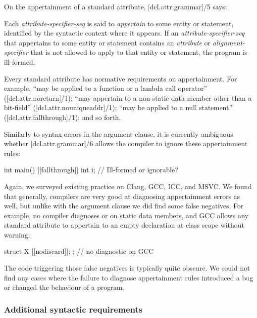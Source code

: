 On the appertainment of a standard attribute, [dcl.attr.grammar]/5 says:

\begin{adjustwidth}{0.5cm}{0.5cm}
Each \emph{attribute-specifier-seq} is said to \emph{appertain} to some entity or statement, identified by the syntactic context where it appears. If an \emph{attribute-specifier-seq} that appertains to some entity or statement contains an \emph{attribute} or \emph{alignment-specifier} that is not allowed to apply to that entity or statement, the program is ill-formed.
\end{adjustwidth}

Every standard attribute has normative requirements on appertainment. For example,  ``may be applied to a function or a lambda call operator'' ([dcl.attr.noreturn]/1); \mbox{} ``may appertain to a non-static data member other than a bit-field'' ([dcl.attr.nouniqueaddr]/1);  ``may be applied to a null statement'' ([dcl.attr.fallthrough]/1); and so forth.

Similarly to syntax errors in the argument clause, it is currently ambiguous whether [dcl.attr.grammar]/6 allows the compiler to ignore these appertainment rules:

\begin{codeblock}
int main() {
  [[fallthrough]] int i;  // Ill-formed or ignorable?
}
\end{codeblock}

Again, we surveyed existing practice on Clang, GCC, ICC, and MSVC. We found that generally, compilers are very good at diagnosing appertainment errors as well, but unlike with the argument clause we did find some false negatives. For example, no compiler diagnoses \tcode{[[deprecated]]} or  on static data members, and GCC allows any standard attribute to appertain to an empty declaration at class scope without warning:
\begin{codeblock}
struct X { [[nodiscard]]; };  // no diagnostic on GCC
\end{codeblock}
The code triggering those false negatives is typically quite obscure. We could not find any cases where the failure to diagnose appertainment rules introduced a bug or changed the behaviour of a program.

\subsubsection{Additional syntactic requirements}

